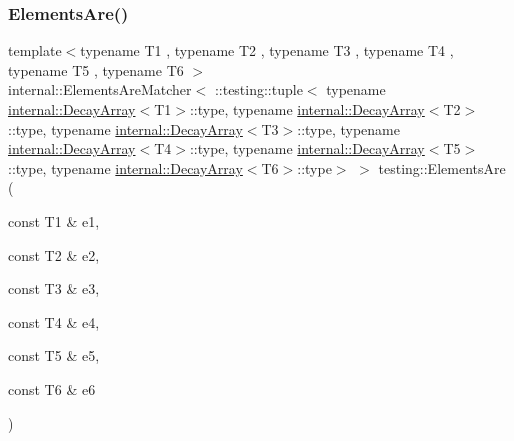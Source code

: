 \subsubsection{\texorpdfstring{ElementsAre()}{ElementsAre()}\hspace{0.1cm}{\footnotesize\ttfamily [7/11]}}
{\footnotesize\ttfamily template$<$typename T1 , typename T2 , typename T3 , typename T4 , typename T5 , typename T6 $>$ \\
internal\+::\+Elements\+Are\+Matcher$<$ \+::testing\+::tuple$<$ typename \mbox{\hyperlink{structtesting_1_1internal_1_1_decay_array}{internal\+::\+Decay\+Array}}$<$T1$>$\+::type, typename \mbox{\hyperlink{structtesting_1_1internal_1_1_decay_array}{internal\+::\+Decay\+Array}}$<$T2$>$\+::type, typename \mbox{\hyperlink{structtesting_1_1internal_1_1_decay_array}{internal\+::\+Decay\+Array}}$<$T3$>$\+::type, typename \mbox{\hyperlink{structtesting_1_1internal_1_1_decay_array}{internal\+::\+Decay\+Array}}$<$T4$>$\+::type, typename \mbox{\hyperlink{structtesting_1_1internal_1_1_decay_array}{internal\+::\+Decay\+Array}}$<$T5$>$\+::type, typename \mbox{\hyperlink{structtesting_1_1internal_1_1_decay_array}{internal\+::\+Decay\+Array}}$<$T6$>$\+::type$>$ $>$ testing\+::\+Elements\+Are (\begin{DoxyParamCaption}\item[{const T1 \&}]{e1,  }\item[{const T2 \&}]{e2,  }\item[{const T3 \&}]{e3,  }\item[{const T4 \&}]{e4,  }\item[{const T5 \&}]{e5,  }\item[{const T6 \&}]{e6 }\end{DoxyParamCaption})\hspace{0.3cm}{\ttfamily [inline]}}

\mbox{\label{namespacetesting_a3af9f549d951a4961825f821e6d47da9}} 

